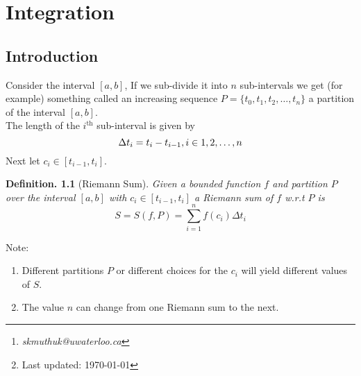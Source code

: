 \documentclass[11pt, a4paper]{memoir}
\title{\subject}
\author{Sachin Kumar\thanks{\itshape skmuthuk@uwaterloo.ca}\\ University of Waterloo}
\date{\semester\thanks{Last updated: \today}}
\theoremstyle{change}
\theoremstyle{plain}
\theoremstyle{nonumberplain}
\newtheorem{definition}{Definition.}
\numberwithin{equation}{section}
\begin{document}
\hypersetup{pageanchor=false}
\maketitle
\newpage
\frontmatter
\hypersetup{pageanchor=true}
\tableofcontents*
\newpage
\mainmatter







\chapter{Integration}

\section{Introduction}
Consider the interval $[a, b]$,
If we sub-divide it into $n$ sub-intervals we get (for example) something called an increasing sequence $P = \{t_0, t_1, t_2, \dots, t_n\}$ a partition of the interval $[a, b]$. \\
The length of the $i^{\text{th}}$ sub-interval is given by $$\Delta t_i = t_i - t_{i-1}, \space \space i \in 1, 2, \dots, n$$
Next let $c_i \in [t_{i-1}, t_i]$.

\begin{definition}[Riemann Sum]
    Given a bounded function $f$ and partition $P$ over the interval $[a, b]$ with $c_i \in [t_{i-1}, t_i]$ a Riemann sum of $f$ w.r.t  $P$ is $$S = S(f, P) = \sum^{n}_{i=1}f(c_i)\Delta t_i$$
\end{definition}
Note:
\begin{enumerate}
    \item Different partitions $P$ or different choices for the $c_i$ will yield different values of $S$.
    \item The value $n$ can change from one Riemann sum to the next.
\end{enumerate}
\end{document}
